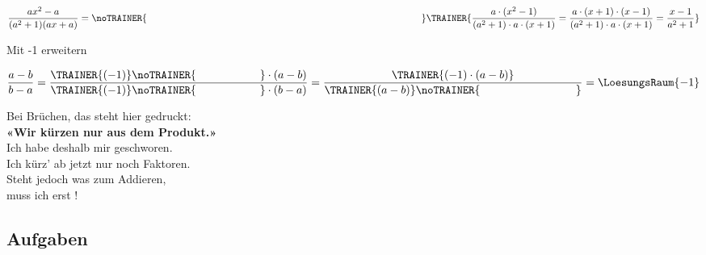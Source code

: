 \begin{beispiel}{}{}
$$\frac{ax^2 - a}{(a^2+1)(ax+a)} = \noTRAINER{\hspace{10cm}}\TRAINER{\frac{a\cdot{}(x^2-1)}{(a^2+1)\cdot{}a\cdot{}(x+1)}=\frac{a\cdot{}(x+1)\cdot{}(x-1)}{(a^2+1)\cdot{}a\cdot{}(x+1)}=\frac{x-1}{a^2+1}} $$
\end{beispiel}


\begin{beispiel}{Mit -1 erweitern}{}

$$\frac{a-b}{b-a} = \frac{\TRAINER{(-1)}\noTRAINER{\hspace{20mm}}\cdot(a-b)}{\TRAINER{(-1)}\noTRAINER{\hspace{20mm}}\cdot(b-a)}
= \frac{\TRAINER{(-1)\cdot(a-b)}}{\TRAINER{(a-b)}\noTRAINER{\hspace{30mm}}} = \LoesungsRaum{-1}$$
\end{beispiel}


\begin{rezept}{}{}

\begin{center}Bei Brüchen, das steht hier gedruckt:\\
\textbf{«Wir kürzen nur aus dem Produkt.»}\\

Ich habe deshalb mir geschworen.\\
Ich kürz' ab jetzt nur noch Faktoren.\\

Steht jedoch was zum Addieren,\noTRAINER{\vspace{5mm}}\\
muss ich erst \noTRAINER{\hspace{5cm}}!\\
\end{center}
\end{rezept}



\subsection*{Aufgaben}
%
%


